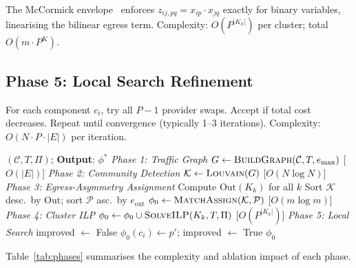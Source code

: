 \documentclass[sigconf,10pt]{acmart}
\begin{document}
The McCormick envelope~\cite{mccormick1976} enforces $z_{ij,pq} = x_{ip} \cdot x_{jq}$
exactly for binary variables, linearising the bilinear egress term.
Complexity: $O(P^{|K_k|})$ per cluster; total $O(m \cdot P^K)$.

\subsection{Phase 5: Local Search Refinement}

For each component $c_i$, try all $P-1$ provider swaps.
Accept if total cost decreases.
Repeat until convergence (typically 1--3 iterations).
Complexity: $O(N \cdot P \cdot |E|)$ per iteration.

\begin{algorithm}[h]
\caption{TEAP: Traffic-Egress-Aware Placement}\label{alg:teap}
\begin{algorithmic}[1]
\Require $(\mathcal{C},T,\Pi)$; \textbf{Output}: $\phi^*$
\Statex \textit{Phase 1: Traffic Graph}
\State $G \leftarrow \textsc{BuildGraph}(\mathcal{C},T,e_{\max})$ \hfill [$O(|E|)$]
\Statex \textit{Phase 2: Community Detection}
\State $\mathcal{K} \leftarrow \textsc{Louvain}(G)$ \hfill [$O(N\log N)$]
\Statex \textit{Phase 3: Egress-Asymmetry Assignment}
\State Compute $\text{Out}(K_k)$ for all $k$
\State Sort $\mathcal{K}$ desc.\ by $\text{Out}$; sort $\mathcal{P}$ asc.\ by $e_{\text{out}}$
\State $\phi_0 \leftarrow \textsc{MatchAssign}(\mathcal{K},\mathcal{P})$ \hfill [$O(m\log m)$]
\Statex \textit{Phase 4: Cluster ILP}
  \State $\phi_0 \leftarrow \phi_0 \cup \textsc{SolveILP}(K_k,T,\Pi)$
  \hfill [$O(P^{|K_k|})$]
\EndFor
\Statex \textit{Phase 5: Local Search}
\Repeat
  \State improved $\leftarrow$ False
      \State $\phi_0(c_i) \leftarrow p'$; improved $\leftarrow$ True
    \EndIf
  \EndFor
{}
\Return $\phi_0$
\end{algorithmic}
\end{algorithm}

Table~\ref{tab:phases} summarises the complexity and ablation impact of each phase.
\end{document}
